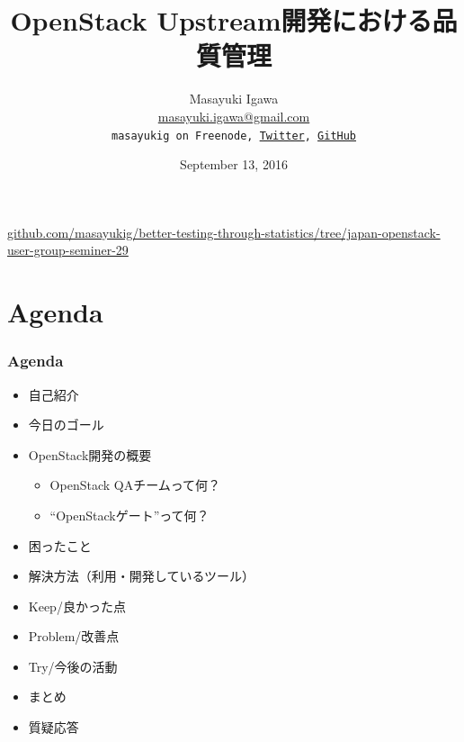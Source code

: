 \documentclass[aspectratio=169,11pt,hyperref={colorlinks=true}]{beamer}
\author[Masayuki Igawa]{%
  \texorpdfstring{%
    \centering
    Masayuki Igawa\\
    \href{mailto:masayuki.igawa@gmail.com}{masayuki.igawa@gmail.com}\\
    \texttt{masayukig on Freenode,
     \href{https://twitter.com/masayukig}{Twitter},
     \href{https://github.com/masayukig}{GitHub}}
  }
  {Masayuki Igawa}
}
\date{September 13, 2016}
\title[OpenStack Upstream開発における品質管理
\hspace{2em}\insertframenumber/\inserttotalframenumber]{OpenStack Upstream開発における品質管理}
\begin{document}


{%
\begin{frame}[noframenumbering]
  \hypersetup{colorlinks,urlcolor=white}
  \titlepage{}
  \centering
  \href{https://github.com/masayukig/better-testing-through-statistics/tree/japan-openstack-user-group-seminer-29}{github.com/masayukig/better-testing-through-statistics/tree/japan-openstack-user-group-seminer-29}
\end{frame}
}

\section{Agenda}
\begin{frame}
  \frametitle{Agenda}
  \begin{itemize}
    \item 自己紹介
    \item 今日のゴール
    \item OpenStack開発の概要
    \begin{itemize}
      \item OpenStack QAチームって何？
      \item ``OpenStackゲート''って何？
    \end{itemize}
    \item 困ったこと
    \item 解決方法（利用・開発しているツール）
    \item Keep/良かった点
    \item Problem/改善点
    \item Try/今後の活動
    \item まとめ
    \item 質疑応答
  \end{itemize}
\end{frame}
\end{document}
